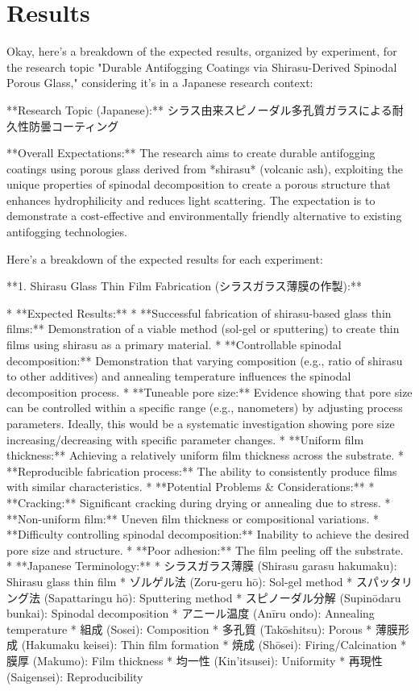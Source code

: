 \documentclass{article}
\begin{document}
\section{Results}
Okay, here's a breakdown of the expected results, organized by experiment, for the research topic "Durable Antifogging Coatings via Shirasu-Derived Spinodal Porous Glass," considering it's in a Japanese research context:

**Research Topic (Japanese):** シラス由来スピノーダル多孔質ガラスによる耐久性防曇コーティング

**Overall Expectations:** The research aims to create durable antifogging coatings using porous glass derived from *shirasu* (volcanic ash), exploiting the unique properties of spinodal decomposition to create a porous structure that enhances hydrophilicity and reduces light scattering.  The expectation is to demonstrate a cost-effective and environmentally friendly alternative to existing antifogging technologies.

Here's a breakdown of the expected results for each experiment:

**1. Shirasu Glass Thin Film Fabrication (シラスガラス薄膜の作製):**

*   **Expected Results:**
    *   **Successful fabrication of shirasu-based glass thin films:**  Demonstration of a viable method (sol-gel or sputtering) to create thin films using shirasu as a primary material.
    *   **Controllable spinodal decomposition:**  Demonstration that varying composition (e.g., ratio of shirasu to other additives) and annealing temperature influences the spinodal decomposition process.
    *   **Tuneable pore size:** Evidence showing that pore size can be controlled within a specific range (e.g., nanometers) by adjusting process parameters. Ideally, this would be a systematic investigation showing pore size increasing/decreasing with specific parameter changes.
    *   **Uniform film thickness:**  Achieving a relatively uniform film thickness across the substrate.
    *   **Reproducible fabrication process:** The ability to consistently produce films with similar characteristics.
*   **Potential Problems & Considerations:**
    *   **Cracking:**  Significant cracking during drying or annealing due to stress.
    *   **Non-uniform film:** Uneven film thickness or compositional variations.
    *   **Difficulty controlling spinodal decomposition:** Inability to achieve the desired pore size and structure.
    *   **Poor adhesion:**  The film peeling off the substrate.
*   **Japanese Terminology:**
    *   シラスガラス薄膜 (Shirasu garasu hakumaku): Shirasu glass thin film
    *   ゾルゲル法 (Zoru-geru hō): Sol-gel method
    *   スパッタリング法 (Sapattaringu hō): Sputtering method
    *   スピノーダル分解 (Supinōdaru bunkai): Spinodal decomposition
    *   アニール温度 (Anīru ondo): Annealing temperature
    *   組成 (Sosei): Composition
    *   多孔質 (Takōshitsu): Porous
    *   薄膜形成 (Hakumaku keisei): Thin film formation
    *   焼成 (Shōsei): Firing/Calcination
    *   膜厚 (Makumo): Film thickness
    *   均一性 (Kin'itsusei): Uniformity
    *   再現性 (Saigensei): Reproducibility
\end{document}
